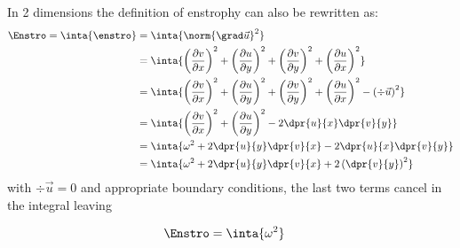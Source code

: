 \begin{derivation}[Enstrophy]
\label{der:enstro}
In 2 dimensions the definition of enstrophy can also be rewritten as:
\begin{equation}\begin{split}
\Enstro
=
\inta{\enstro}
&=\inta{
\norm{\grad \vec{u}}^2}
\\
&=\inta{
\left(\frac{\partial v}{\partial x}\right)^2
+ \left(\frac{\partial u}{\partial y} \right)^2
+\left(\frac{\partial v}{\partial y}\right)^2
+ \left(\frac{\partial u}{\partial x} \right)^2}
\\
&=\inta{
\left(\frac{\partial v}{\partial x}\right)^2
+ \left(\frac{\partial u}{\partial y} \right)^2
+\left(\frac{\partial v}{\partial y}\right)^2
+ \left(\frac{\partial u}{\partial x} \right)^2
-\left(\div \vec{u}\right)^{2}}
\\
&=\inta{
\left(\frac{\partial v}{\partial x}\right)^2
+ \left(\frac{\partial u}{\partial y} \right)^2
-2 \dpr{u}{x}\dpr{v}{y}
}
\\
&=\inta{
\omega^{2}
+2 \dpr{u}{y}\dpr{v}{x}
-2 \dpr{u}{x}\dpr{v}{y}
}\\
&=\inta{
\omega^{2}
+2 \dpr{u}{y}\dpr{v}{x}
+2 \left(\dpr{v}{y} \right)^2
}
\end{split}\end{equation}
with $\div \vec{u}=0$ and appropriate boundary conditions, the last two
terms	cancel in the integral leaving

\begin{equation}\begin{split}
\Enstro
&=\inta{
\omega^{2}
}
\end{split}\end{equation}

\end{derivation}


